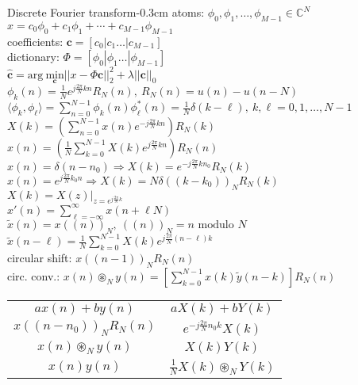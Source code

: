 \documentclass[10pt,3col]{cheatsheet}
\begin{document}
\begin{multicols*}{3}
\begin{cheatsheetbox}{Discrete Fourier transform}{-0.3cm}
    atoms: $\phi_0, \phi_1, \dots, \phi_{M-1} \in \mathbb{C}^N$\\
    $x = c_0 \phi_0 + c_1 \phi_1 + \cdots + c_{M-1}\phi_{M-1}$\\
    coefficients: $\mathbf{c} = \left[c_0 | c_1 \dots | c_{M-1}\right]$\\
    dictionary: $\Phi = \left[\phi_0 | \phi_1 \dots | \phi_{M-1}\right]$\\
	$\hat{\mathbf{c}} = \mathrm{arg} \ \underset{\mathbf{c}}{\mathrm{min}}||x - \Phi \mathbf{c}||_2^2 + \lambda||\mathbf{c}||_0$\\
    $\phi_k(n) = \frac{1}{N}e^{j\frac{2\pi}{N}kn}R_N(n), \ R_N(n) = u(n) - u(n - N)$\\
    $\langle \phi_k, \phi_\ell\rangle = \sum_{n=0}^{N-1} \phi_k(n) \phi_\ell^\ast(n) = \frac{1}{N} \delta(k - \ell), \ k, \ell = 0, 1, \dots, N-1$\\
    $X(k) = \left(\sum_{n=0}^{N-1}x(n)e^{-j\frac{2\pi}{N}kn}\right)R_N(k)$\\
    $x(n) = \left(\frac{1}{N}\sum_{k = 0}^{N-1}X(k)e^{j\frac{2\pi}{N}kn}\right) R_N(n)$\\
    $x(n) = \delta(n - n_0) \Rightarrow X(k) = e^{-j\frac{2\pi}{N}kn_0}R_N(k)$\\
    $x(n) = e^{j\frac{2\pi}{N}k_0 n} \Rightarrow X(k) = N\delta((k - k_0))_NR_N(k)$\\
    $X(k) = X(z)|_{z = e^{j \frac{2\pi}{N} k}}$\\
    $x'(n) = \sum_{\ell = -\infty}^{\infty} x(n + \ell N)$\\
    $\tilde{x}(n) = x((n))_N, \ ((n))_N = n \text{ modulo } N$\\
    $\tilde{x}(n - \ell) = \frac{1}{N}\sum_{k = 0}^{N-1} X(k) e^{j\frac{2\pi}{N}(n - \ell)k}$\\
    circular shift: $x((n - 1))_N R_N(n)$\\
    circ. conv.: $x(n) \circledast_N y(n) = \left[\sum_{k = 0}^{N - 1} x(k) \tilde{y}(n - k)\right]R_N(n)$\\
    \begin{tabular}{c c}
	    $ax(n) + by(n)$ & $aX(k) + bY(k)$ \\
	    $x((n - n_0))_NR_N(n)$ & $e^{-j\frac{2\pi}{N} n_0k}X(k)$ \\
	    $x(n) \circledast_N y(n)$ & $X(k)Y(k)$ \\
        $x(n) y(n)$ & $\frac{1}{N}X(k)\circledast_N Y(k)$ \\

\end{tabular}
\end{cheatsheetbox}
\end{multicols*}
\end{document}
